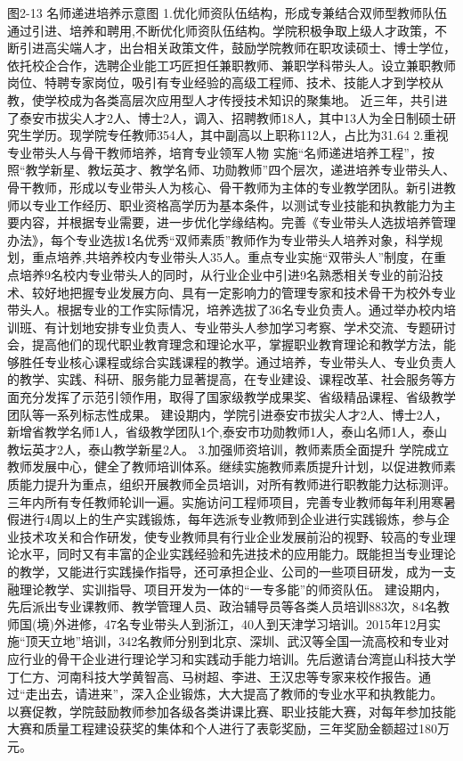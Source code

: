 图2-13 名师递进培养示意图
1.优化师资队伍结构，形成专兼结合双师型教师队伍　
通过引进、培养和聘用,不断优化师资队伍结构。学院积极争取上级人才政策，不断引进高尖端人才，出台相关政策文件，鼓励学院教师在职攻读硕士、博士学位，依托校企合作，选聘企业能工巧匠担任兼职教师、兼职学科带头人。设立兼职教师岗位、特聘专家岗位，吸引有专业经验的高级工程师、技术、技能人才到学校从教，使学校成为各类高层次应用型人才传授技术知识的聚集地。
近三年，共引进了泰安市拔尖人才2人、博士2人，调入、招聘教师18人，其中13人为全日制硕士研究生学历。现学院专任教师354人，其中副高以上职称112人，占比为31.64%
2.重视专业带头人与骨干教师培养，培育专业领军人物
实施“名师递进培养工程”，按照“教学新星、教坛英才、教学名师、功勋教师”四个层次，递进培养专业带头人、骨干教师，形成以专业带头人为核心、骨干教师为主体的专业教学团队。新引进教师以专业工作经历、职业资格高学历为基本条件，以测试专业技能和执教能力为主要内容，并根据专业需要，进一步优化学缘结构。完善《专业带头人选拔培养管理办法》，每个专业选拔1名优秀“双师素质”教师作为专业带头人培养对象，科学规划，重点培养,共培养校内专业带头人35人。重点专业实施“双带头人”制度，在重点培养9名校内专业带头人的同时，从行业企业中引进9名熟悉相关专业的前沿技术、较好地把握专业发展方向、具有一定影响力的管理专家和技术骨干为校外专业带头人。根据专业的工作实际情况，培养选拔了36名专业负责人。通过举办校内培训班、有计划地安排专业负责人、专业带头人参加学习考察、学术交流、专题研讨会，提高他们的现代职业教育理念和理论水平，掌握职业教育理论和教学方法，能够胜任专业核心课程或综合实践课程的教学。通过培养，专业带头人、专业负责人的教学、实践、科研、服务能力显著提高，在专业建设、课程改革、社会服务等方面充分发挥了示范引领作用，取得了国家级教学成果奖、省级精品课程、省级教学团队等一系列标志性成果。
建设期内，学院引进泰安市拔尖人才2人、博士2人，新增省教学名师1人，省级教学团队1个,泰安市功勋教师1人，泰山名师1人，泰山教坛英才2人，泰山教学新星2人。
3.加强师资培训，教师素质全面提升
学院成立教师发展中心，健全了教师培训体系。继续实施教师素质提升计划，以促进教师素质能力提升为重点，组织开展教师全员培训，对所有教师进行职教能力达标测评。三年内所有专任教师轮训一遍。实施访问工程师项目，完善专业教师每年利用寒暑假进行4周以上的生产实践锻炼，每年选派专业教师到企业进行实践锻炼，参与企业技术攻关和合作研发，使专业教师具有行业企业发展前沿的视野、较高的专业理论水平，同时又有丰富的企业实践经验和先进技术的应用能力。既能担当专业理论的教学，又能进行实践操作指导，还可承担企业、公司的一些项目研发，成为一支融理论教学、实训指导、项目开发为一体的“一专多能”的师资队伍。
建设期内，先后派出专业课教师、教学管理人员、政治辅导员等各类人员培训883次，84名教师国(境)外进修，47名专业带头人到浙江，40人到天津学习培训。2015年12月实施“顶天立地”培训，342名教师分别到北京、深圳、武汉等全国一流高校和专业对应行业的骨干企业进行理论学习和实践动手能力培训。先后邀请台湾崑山科技大学丁仁方、河南科技大学黄智高、马树超、李进、王汉忠等专家来校作报告。通过“走出去，请进来”，深入企业锻炼，大大提高了教师的专业水平和执教能力。
以赛促教，学院鼓励教师参加各级各类讲课比赛、职业技能大赛，对每年参加技能大赛和质量工程建设获奖的集体和个人进行了表彰奖励，三年奖励金额超过180万元。

